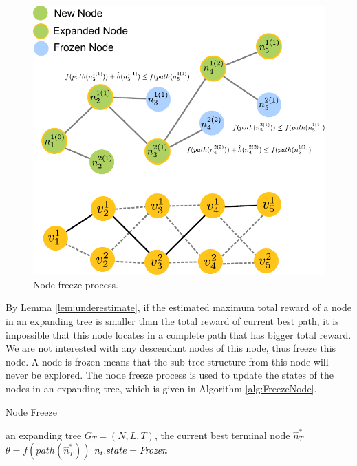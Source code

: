\documentclass[12pt]{article}
\begin{document}
\begin{figure}
\centering
\includegraphics[width=0.7\linewidth]{./images/freeze_process.pdf}
\caption{Node freeze process.}
\label{fig:freeze_process}
\end{figure}

By Lemma \ref{lem:underestimate}, if the estimated maximum total reward of a node in an expanding tree is smaller than the total reward of current best path, it is impossible that this node locates in a complete path that has bigger total reward.
We are not interested with any descendant nodes of this node, thus freeze this node.
A node is frozen means that the sub-tree structure from this node will never be explored.
The node freeze process is used to update the states of the nodes in an expanding tree, which is given in Algorithm \ref{alg:FreezeNode}.

\begin{algorithm}
\caption{Node Freeze}
\label{alg:FreezeNode}
\begin{algorithmic}[1]
\REQUIRE 
an expanding tree $ G_{T} = (N, L, T) $, the current best terminal node $ \hat{n}^{*}_{T} $
\STATE $ \theta = f(path(\hat{n}^{*}_{T})) $
\STATE $ n_{t}.state = \mbox{\emph{Frozen}} $
\ENDIF
\ENDFOR
\end{algorithmic}
\end{algorithm}
\end{document}

